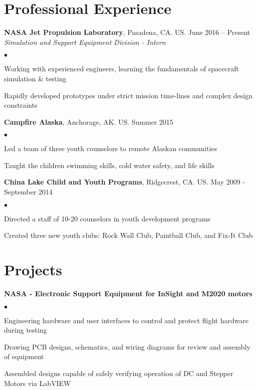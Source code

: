 \documentclass[margin,line]{res}
\newenvironment{list2}{
  \begin{list}{$\bullet$}{%
      \setlength{\itemsep}{0in}
      \setlength{\parsep}{0in} \setlength{\parskip}{0in}
      \setlength{\topsep}{0in} \setlength{\partopsep}{0in}
      \setlength{\leftmargin}{0.2in}}}{\end{list}}
\begin{document}
\begin{resume}
\section{\sc Professional Experience}
{\bf NASA Jet Propulsion Laboratory}, Pasadena, CA. US. \hfill{June 2016 -- Present}\\
{\em Simulation and Support Equipment Division - Intern}\hfill 
\begin{list2} %
\item Working with experienced engineers, learning the fundamentals of spacecraft simulation \& testing
\item Rapidly developed prototypes under strict mission time-lines and complex design constraints 
\end{list2}


{\bf Campfire Alaska}, Anchorage, AK. US. \hfill{Summer 2015}
\begin{list2} %
\item Led a team of three youth counselors to remote Alaskan communities  
\item Taught the children swimming skills, cold water safety, and life skills 
\end{list2}



{\bf China Lake Child and Youth Programs}, Ridgecrest, CA. US. \hfill{May 2009 - September 2014}
\begin{list2} %
\item Directed a staff of 10-20 counselors in youth development programs
\item Created three new youth clubs: Rock Wall Club, Paintball Club, and Fix-It Club
\end{list2}


\section{\sc Projects}
{\bf NASA - Electronic Support Equipment for InSight and M2020 motors}
\begin{list2}
\item Engineering hardware and user interfaces to control and protect flight hardware during testing
\item Drawing PCB designs, schematics, and wiring diagrams for review and assembly of equipment
\item Assembled designs capable of safely verifying operation of DC and Stepper Motors via LabVIEW
\end{list2}





\end{resume}
\end{document}
